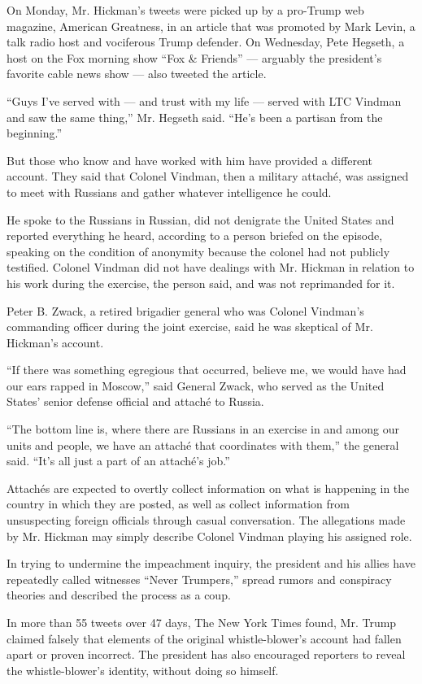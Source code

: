 On Monday, Mr. Hickman's tweets were picked up by a pro-Trump web
magazine, American Greatness, in an article that was promoted by Mark
Levin, a talk radio host and vociferous Trump defender. On Wednesday,
Pete Hegseth, a host on the Fox morning show ``Fox \& Friends'' ---
arguably the president's favorite cable news show --- also tweeted the
article.

``Guys I've served with --- and trust with my life --- served with LTC
Vindman and saw the same thing,'' Mr. Hegseth said. ``He's been a
partisan from the beginning.''

But those who know and have worked with him have provided a different
account. They said that Colonel Vindman, then a military attaché, was
assigned to meet with Russians and gather whatever intelligence he
could.

He spoke to the Russians in Russian, did not denigrate the United States
and reported everything he heard, according to a person briefed on the
episode, speaking on the condition of anonymity because the colonel had
not publicly testified. Colonel Vindman did not have dealings with Mr.
Hickman in relation to his work during the exercise, the person said,
and was not reprimanded for it.

Peter B. Zwack, a retired brigadier general who was Colonel Vindman's
commanding officer during the joint exercise, said he was skeptical of
Mr. Hickman's account.

``If there was something egregious that occurred, believe me, we would
have had our ears rapped in Moscow,'' said General Zwack, who served as
the United States' senior defense official and attaché to Russia.

``The bottom line is, where there are Russians in an exercise in and
among our units and people, we have an attaché that coordinates with
them,'' the general said. ``It's all just a part of an attaché's job.''

Attachés are expected to overtly collect information on what is
happening in the country in which they are posted, as well as collect
information from unsuspecting foreign officials through casual
conversation. The allegations made by Mr. Hickman may simply describe
Colonel Vindman playing his assigned role.

In trying to undermine the impeachment inquiry, the president and his
allies have repeatedly called witnesses ``Never Trumpers,'' spread
rumors and conspiracy theories and described the process as a coup.

In more than 55 tweets over 47 days, The New York Times found, Mr. Trump
claimed falsely that elements of the original whistle-blower's account
had fallen apart or proven incorrect. The president has also encouraged
reporters to reveal the whistle-blower's identity, without doing so
himself.

